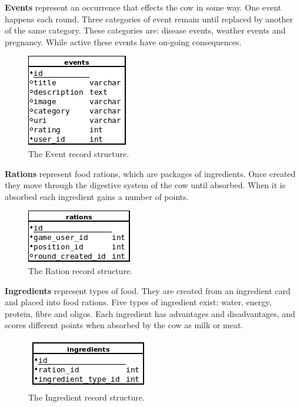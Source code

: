 \textbf{Events} represent an occurrence that effects the cow in some way. One event happens each round. Three categories of event remain until replaced by another of the same category. These categories are: disease events, weather events and pregnancy. While active these events have on-going consequences.
\begin{figure}[ht]
\centering
\includegraphics{Images/2/events}
\caption{The Event record structure.}
\label{2_model_event}
\end{figure}

\textbf{Rations} represent food rations, which are packages of ingredients. Once created they move through the digestive system of the cow until absorbed. When it is absorbed each ingredient gains a number of points.
\begin{figure}[ht]
\centering
\includegraphics{Images/2/rations}
\caption{The Ration record structure.}
\label{2_model_ration}
\end{figure}

\textbf{Ingredients} represent types of food. They are created from an ingredient card and placed into food rations. Five types of ingredient exist: water, energy, protein, fibre and oligos. Each ingredient has advantages and disadvantages, and scores different points when absorbed by the cow as milk or meat.
\begin{figure}[ht]
\centering
\includegraphics{Images/2/ingredients}
\caption{The Ingredient record structure.}
\label{2_model_ingredient}
\end{figure}

